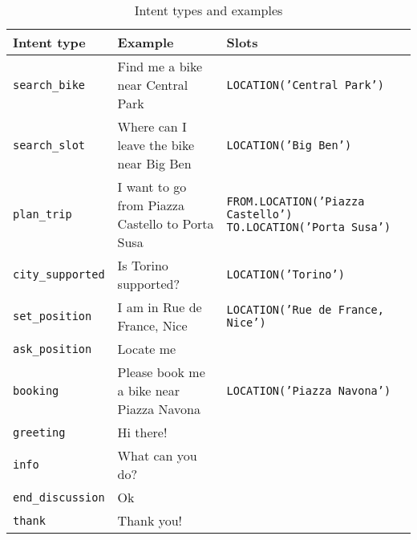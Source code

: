 
\begin{table}
  \begin{tabularx}{\textwidth}{lXX}
    \textbf{Intent type} & \textbf{Example} & \textbf{Slots} \\
    \toprule
    \texttt{search\_bike} & Find me a bike near Central Park & \texttt{LOCATION('Central Park')} \\
    \midrule
    \texttt{search\_slot} & Where can I leave the bike near Big Ben &\texttt{LOCATION('Big Ben')} \\
    \midrule
    \texttt{plan\_trip} & I want to go from Piazza Castello to Porta Susa & \texttt{FROM.LOCATION('Piazza Castello') TO.LOCATION('Porta Susa')} \\
    \midrule
    \texttt{city\_supported} & Is Torino supported? & \texttt{LOCATION('Torino')} \\
    \midrule
    \texttt{set\_position} & I am in Rue de France, Nice & \texttt{LOCATION('Rue de France, Nice')} \\
    \midrule
    \texttt{ask\_position} & Locate me & \\
    \midrule
    \texttt{booking} & Please book me a bike near Piazza Navona & \texttt{LOCATION('Piazza Navona')} \\
    \midrule
    \texttt{greeting} & Hi there! & \\
    \midrule
    \texttt{info} & What can you do? & \\
    \midrule
    \texttt{end\_discussion} & Ok & \\
    \midrule
    \texttt{thank} & Thank you! & \\
    \bottomrule
  \end{tabularx}
  \caption{Intent types and examples}\label{tab:nluTypes}
\end{table}
